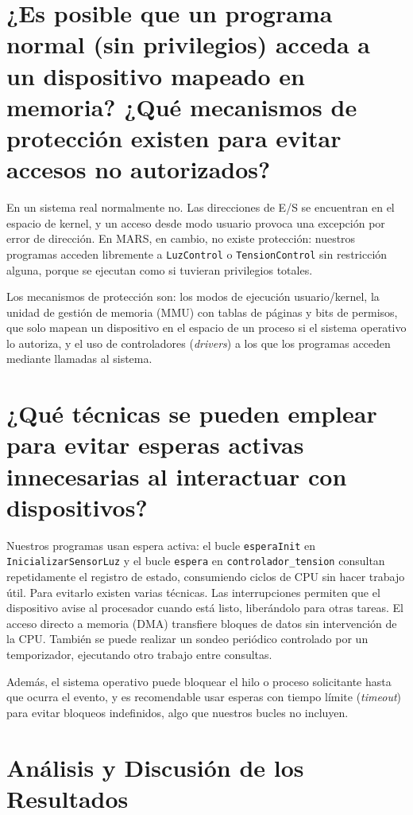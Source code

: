\documentclass[12pt,a4paper]{article}
\begin{document}
\section{¿Es posible que un programa normal (sin privilegios) acceda a un dispositivo mapeado en memoria? ¿Qué mecanismos de protección existen para evitar accesos no autorizados?}

En un sistema real normalmente no. Las direcciones de E/S se encuentran en el espacio de kernel, y un acceso desde modo usuario provoca una excepción por error de dirección. En MARS, en cambio, no existe protección: nuestros programas acceden libremente a \texttt{LuzControl} o \texttt{TensionControl} sin restricción alguna, porque se ejecutan como si tuvieran privilegios totales.

Los mecanismos de protección son: los modos de ejecución usuario/kernel, la unidad de gestión de memoria (MMU) con tablas de páginas y bits de permisos, que solo mapean un dispositivo en el espacio de un proceso si el sistema operativo lo autoriza, y el uso de controladores (\emph{drivers}) a los que los programas acceden mediante llamadas al sistema.

\section{¿Qué técnicas se pueden emplear para evitar esperas activas innecesarias al interactuar con dispositivos?}

Nuestros programas usan espera activa: el bucle \texttt{esperaInit} en \texttt{InicializarSensorLuz} y el bucle \texttt{espera} en \texttt{controlador\_tension} consultan repetidamente el registro de estado, consumiendo ciclos de CPU sin hacer trabajo útil. Para evitarlo existen varias técnicas. Las interrupciones permiten que el dispositivo avise al procesador cuando está listo, liberándolo para otras tareas. El acceso directo a memoria (DMA) transfiere bloques de datos sin intervención de la CPU. También se puede realizar un sondeo periódico controlado por un temporizador, ejecutando otro trabajo entre consultas.

Además, el sistema operativo puede bloquear el hilo o proceso solicitante hasta que ocurra el evento, y es recomendable usar esperas con tiempo límite (\emph{timeout}) para evitar bloqueos indefinidos, algo que nuestros bucles no incluyen.

\section{Análisis y Discusión de los Resultados}
\end{document}
